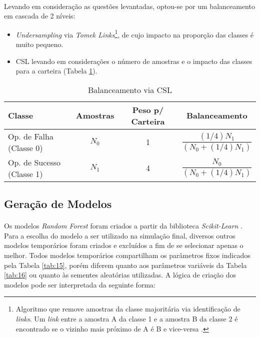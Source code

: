 \paragraph{} Levando em consideração as questões levantadas, optou-se por um balanceamento em cascada de 2 níveis:

\begin{itemize}
    \item \textit{Undersampling} via \textit{Tomek Links}\footnote{Algoritmo que remove amostras da classe majoritária via identificação de \textit{links}. Um \textit{link} entre a amostra A da classe 1 e a amostra B da classe 2 é encontrado se o vizinho mais próximo de A é B e vice-versa \cite{he2013imbalanced}.}, de cujo impacto na proporção das classes é muito pequeno.
    \item CSL levando em considerações o número de amostras e o impacto das classes para a carteira (Tabela \ref{tab:8}).
\end{itemize}

\begin{table}[h!]
    \begin{center}
        \begin{tabular}{ l|c|c|c }
            Classe & Amostras & Peso p/ Carteira & Balanceamento \\
            \hline
            Op. de Falha (Classe 0) & \begin{math} N_0 \end{math} & 1 & \begin{math} \dfrac{(1/4)N_1}{(N_0+(1/4)N_1)} \end{math} \\
            Op. de Sucesso (Classe 1) & \begin{math} N_1 \end{math} & 4 & \begin{math} \dfrac{N_0}{(N_0+(1/4)N_1)} \end{math} \\
        \end{tabular}
        \caption{Balanceamento via CSL}
        \label{tab:8}
    \end{center}
\end{table}


\FloatBarrier
\subsection{Geração de Modelos}

\paragraph{} Os modelos \textit{Random Forest} foram criados a partir da biblioteca \textit{Scikit-Learn} \cite{scikit}. Para a escolha do modelo a ser utilizado na simulação final, diversos outros modelos temporários foram criados e excluídos a fim de se selecionar apenas o melhor. Todos modelos temporários compartilham os parâmetros fixos indicados pela Tabela \ref{tab:15}, porém diferem quanto aos parâmetros variáveis da Tabela \ref{tab:16} ou quanto às sementes aleatórias utilizadas. A lógica de criação dos modelos pode ser interpretada da seguinte forma:

